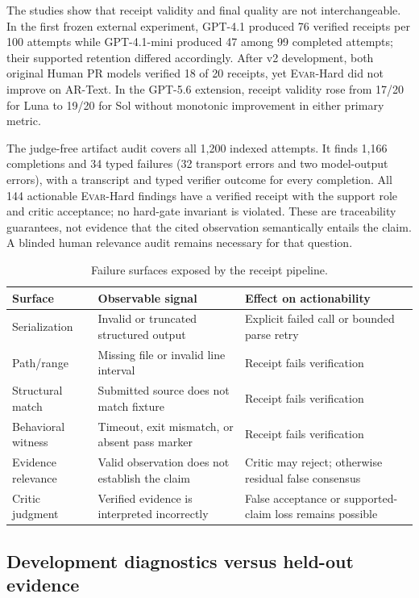 \documentclass[acmsmall,screen,review,anonymous]{acmart}
\newcommand{\evar}{\textsc{Evar}\xspace}
\begin{document}
The studies show that receipt validity and final quality are not interchangeable. In the first frozen external experiment, GPT-4.1 produced 76 verified receipts per 100 attempts while GPT-4.1-mini produced 47 among 99 completed attempts; their supported retention differed accordingly. After v2 development, both original Human PR models verified 18 of 20 receipts, yet \evar-Hard did not improve on AR-Text. In the GPT-5.6 extension, receipt validity rose from 17/20 for Luna to 19/20 for Sol without monotonic improvement in either primary metric.

The judge-free artifact audit covers all 1,200 indexed attempts. It finds 1,166 completions and 34 typed failures (32 transport errors and two model-output errors), with a transcript and typed verifier outcome for every completion. All 144 actionable \evar-Hard findings have a verified receipt with the support role and critic acceptance; no hard-gate invariant is violated. These are traceability guarantees, not evidence that the cited observation semantically entails the claim. A blinded human relevance audit remains necessary for that question.

\begin{table}[h]
\centering
\caption{Failure surfaces exposed by the receipt pipeline.}
\label{tab:failures}
\small
\begin{tabularx}{\linewidth}{@{}lXX@{}}
\toprule
Surface & Observable signal & Effect on actionability \\
\midrule
Serialization & Invalid or truncated structured output & Explicit failed call or bounded parse retry \\
Path/range & Missing file or invalid line interval & Receipt fails verification \\
Structural match & Submitted source does not match fixture & Receipt fails verification \\
Behavioral witness & Timeout, exit mismatch, or absent pass marker & Receipt fails verification \\
Evidence relevance & Valid observation does not establish the claim & Critic may reject; otherwise residual false consensus \\
Critic judgment & Verified evidence is interpreted incorrectly & False acceptance or supported-claim loss remains possible \\
\bottomrule
\end{tabularx}
\end{table}

\subsection{Development diagnostics versus held-out evidence}
\end{document}
